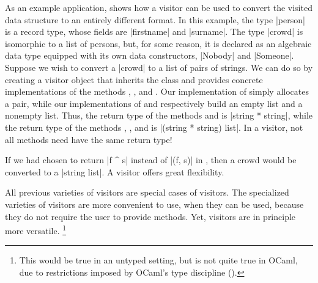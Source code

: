 \documentclass[11pt,a4paper,twoside]{article}
\begin{document}
As an example application,  shows how a \fold visitor can be
used to convert the visited data structure to an entirely different format. In
this example, the type \oc|person| is a record type, whose fields are
\oc|firstname| and \oc|surname|. The type \oc|crowd| is isomorphic to a list
of persons, but, for some reason, it is declared as an algebraic data type
equipped with its own data constructors, \oc|Nobody| and \oc|Someone|. Suppose
we wish to convert a \oc|crowd| to a list of pairs of strings. We can do so by
creating a visitor object that inherits the class \fold and provides concrete
implementations of the methods ,
, and .
Our implementation of  simply allocates
a pair, while our implementations of
 and 
respectively build an empty list and a nonempty list.
Thus, the return type of the methods 
and  is \oc|string * string|,
while the return type of the methods ,
, and  is
\oc|(string * string) list|. In a \fold visitor, not all methods
need have the same return type!

If we had chosen to return \oc|f ^ s| instead of \oc|(f, s)| in
, then a crowd would be converted to
a \oc|string list|. A \fold visitor offers great flexibility.

All previous varieties of visitors are special cases of \fold visitors. The
specialized varieties of visitors are more convenient to use, when they can be
used, because they do not require the user to provide \tyconascendingmethod{}
methods. Yet, \fold visitors are in principle more versatile.%
%
\footnote{This would be true in an untyped setting, but is not quite true in OCaml,
due to restrictions imposed by OCaml's type discipline ().}


\end{document}
